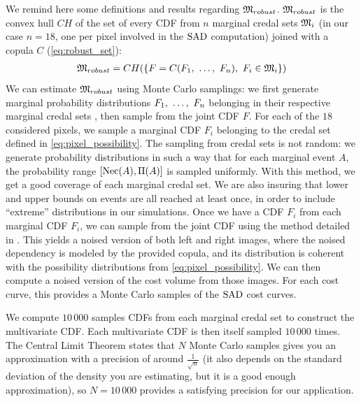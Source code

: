 We remind here some definitions and results regarding $\mathfrak{M}_{robust}$. $\mathfrak{M}_{robust}$ is the convex hull $CH$ of the set of every CDF from $n$ marginal credal sets $\mathfrak{M}_i$ (in our case $n=18$, one per pixel involved in the $\mathrm{SAD}$ computation) joined with a copula $C$ (\cref{eq:robust_set}):
\begin{align*}
    \mathfrak{M}_{robust} = CH(\{F=C(F_1 , ~\dots, ~ F_n),~F_i\in\mathfrak{M}_i \})
\end{align*}
We can estimate $\mathfrak{M}_{robust}$ using Monte Carlo samplings: we first generate marginal probability distributions $F_1, ~\dots, ~ F_n$ belonging in their respective marginal credal sets \cite{troffaes_note_2017}, then sample from the joint CDF $F$. For each of the $18$ considered pixels, we sample a marginal CDF $F_i$ belonging to the credal set defined in \cref{eq:pixel_possibility}. The sampling from credal sets is not random: we generate probability distributions in such a way that for each marginal event $A$, the probability range $[\mathrm{Nec}(A), \Pi(A)]$ is sampled uniformly. With this method, we get a good coverage of each marginal credal set. We are also insuring that lower and upper bounds on events are all reached at least once, in order to include ``extreme'' distributions in our simulations. Once we have a CDF $F_i$ from each marginal CDF $F_i$, we can sample from the joint CDF using the method detailed in . This yields a noised version of both left and right images, where the noised dependency is modeled by the provided copula, and its distribution is coherent with the possibility distributions from \cref{eq:pixel_possibility}. We can then compute a noised version of the cost volume from those images. For each cost curve, this provides a Monte Carlo samples of the $\mathrm{SAD}$ cost curves.

We compute $10\,000$ samples CDFs from each marginal credal set to construct the multivariate CDF. Each multivariate CDF is then itself sampled $10\,000$ times. The Central Limit Theorem states that $N$ Monte Carlo samples gives you an approximation with a precision of around $\frac{1}{\sqrt{n}}$ (it also depends on the standard deviation of the density you are estimating, but it is a good enough approximation), so $N=10\,000$ provides a satisfying precision for our application.  

